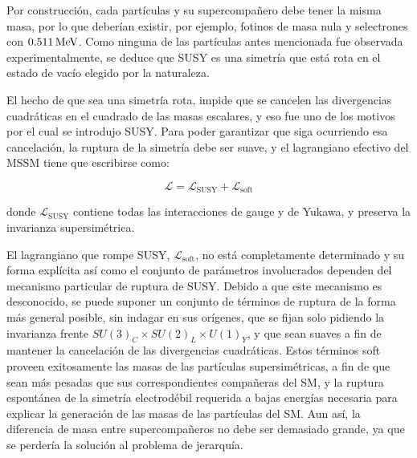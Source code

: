 Por construcción, cada partículas y su supercompañero debe tener la misma masa, por lo que deberían existir, por ejemplo, fotinos de masa nula y selectrones con $0.511 \, \mathrm{MeV}$. Como ninguna de las partículas antes mencionada fue observada experimentalmente, se deduce que SUSY es una simetría que está rota en el estado de vacío elegido por la naturaleza.

El hecho de que sea una simetría rota, impide que se cancelen las divergencias cuadráticas en el cuadrado de las masas escalares, y eso fue uno de los motivos por el cual se introdujo SUSY. Para poder garantizar que siga ocurriendo esa cancelación, la ruptura de la simetría debe ser suave, y el lagrangiano efectivo del MSSM tiene que escribirse como:

\begin{equation}
\mathcal{L}=\mathcal{L}_{\text{SUSY}}+\mathcal{L}_{\text{soft}}
\end{equation}

\noindent
donde $\mathcal{L}_{\text{SUSY}}$ contiene todas las interacciones de gauge y de Yukawa, y preserva la invarianza supersimétrica. 







El lagrangiano que rompe SUSY, $\mathcal{L}_{\text{soft}}$, no está completamente determinado y su forma explícita así como el conjunto de parámetros involucrados dependen del mecanismo particular de ruptura de SUSY. Debido a que este mecanismo es desconocido, se puede suponer un conjunto de términos de ruptura de la forma más general posible, sin indagar en sus orígenes, que se fijan solo pidiendo la invarianza frente $SU(3)_{C}\times SU(2)_{L}\times U(1)_{Y}$, y que sean suaves a fin de mantener la cancelación de las divergencias cuadráticas. Estos términos soft proveen exitosamente las masas de las partículas supersimétricas, a fin de que sean más pesadas que sus correspondientes compañeras del SM, y la ruptura espontánea de la simetría electrodébil requerida a bajas energías necesaria para explicar la generación de las masas de las partículas del SM. Aun así, la diferencia de masa entre supercompañeros no debe ser demasiado grande, ya que se perdería la solución al problema de jerarquía.

